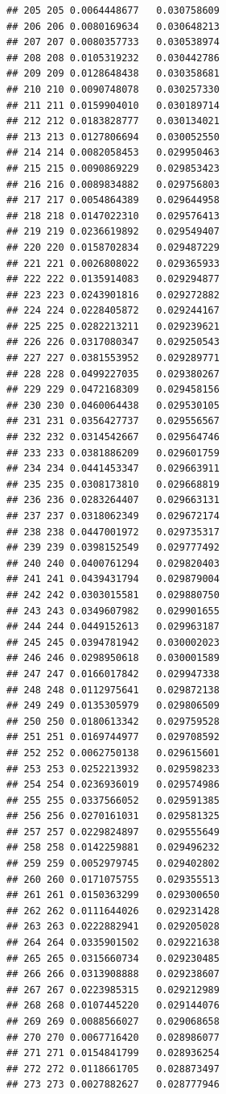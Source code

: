 \documentclass[
]{book}
\begin{document}
\begin{verbatim}
## 205 205 0.0064448677   0.030758609
## 206 206 0.0080169634   0.030648213
## 207 207 0.0080357733   0.030538974
## 208 208 0.0105319232   0.030442786
## 209 209 0.0128648438   0.030358681
## 210 210 0.0090748078   0.030257330
## 211 211 0.0159904010   0.030189714
## 212 212 0.0183828777   0.030134021
## 213 213 0.0127806694   0.030052550
## 214 214 0.0082058453   0.029950463
## 215 215 0.0090869229   0.029853423
## 216 216 0.0089834882   0.029756803
## 217 217 0.0054864389   0.029644958
## 218 218 0.0147022310   0.029576413
## 219 219 0.0236619892   0.029549407
## 220 220 0.0158702834   0.029487229
## 221 221 0.0026808022   0.029365933
## 222 222 0.0135914083   0.029294877
## 223 223 0.0243901816   0.029272882
## 224 224 0.0228405872   0.029244167
## 225 225 0.0282213211   0.029239621
## 226 226 0.0317080347   0.029250543
## 227 227 0.0381553952   0.029289771
## 228 228 0.0499227035   0.029380267
## 229 229 0.0472168309   0.029458156
## 230 230 0.0460064438   0.029530105
## 231 231 0.0356427737   0.029556567
## 232 232 0.0314542667   0.029564746
## 233 233 0.0381886209   0.029601759
## 234 234 0.0441453347   0.029663911
## 235 235 0.0308173810   0.029668819
## 236 236 0.0283264407   0.029663131
## 237 237 0.0318062349   0.029672174
## 238 238 0.0447001972   0.029735317
## 239 239 0.0398152549   0.029777492
## 240 240 0.0400761294   0.029820403
## 241 241 0.0439431794   0.029879004
## 242 242 0.0303015581   0.029880750
## 243 243 0.0349607982   0.029901655
## 244 244 0.0449152613   0.029963187
## 245 245 0.0394781942   0.030002023
## 246 246 0.0298950618   0.030001589
## 247 247 0.0166017842   0.029947338
## 248 248 0.0112975641   0.029872138
## 249 249 0.0135305979   0.029806509
## 250 250 0.0180613342   0.029759528
## 251 251 0.0169744977   0.029708592
## 252 252 0.0062750138   0.029615601
## 253 253 0.0252213932   0.029598233
## 254 254 0.0236936019   0.029574986
## 255 255 0.0337566052   0.029591385
## 256 256 0.0270161031   0.029581325
## 257 257 0.0229824897   0.029555649
## 258 258 0.0142259881   0.029496232
## 259 259 0.0052979745   0.029402802
## 260 260 0.0171075755   0.029355513
## 261 261 0.0150363299   0.029300650
## 262 262 0.0111644026   0.029231428
## 263 263 0.0222882941   0.029205028
## 264 264 0.0335901502   0.029221638
## 265 265 0.0315660734   0.029230485
## 266 266 0.0313908888   0.029238607
## 267 267 0.0223985315   0.029212989
## 268 268 0.0107445220   0.029144076
## 269 269 0.0088566027   0.029068658
## 270 270 0.0067716420   0.028986077
## 271 271 0.0154841799   0.028936254
## 272 272 0.0118661705   0.028873497
## 273 273 0.0027882627   0.028777946

\end{verbatim}
\end{document}
